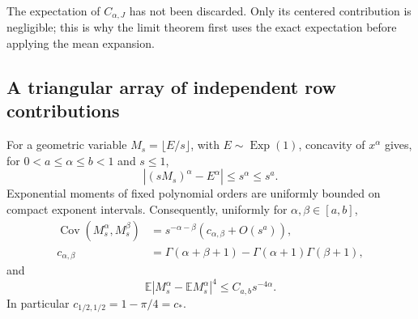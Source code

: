 \documentclass[11pt,letterpaper]{article}
\numberwithin{equation}{section}
\theoremstyle{definition}\newtheorem{definition}[theorem]{Definition}
\theoremstyle{remark}\newtheorem{remark}[theorem]{Remark}
\newcommand{\E}{\mathbb E}
\DeclareMathOperator{\Cov}{Cov}
\begin{document}
The expectation of $C_{\alpha,J}$ has not been discarded. Only its
centered contribution is negligible; this is why the limit theorem
first uses the exact expectation before applying the mean expansion.

\subsection{A triangular array of independent row contributions}
For a geometric variable $M_s=\lfloor E/s\rfloor$, with
$E\sim\operatorname{Exp}(1)$, concavity of $x^\alpha$ gives, for
$0<a\le\alpha\le b<1$ and $s\le1$,
\begin{equation}\label{dmv:fl:eq:floorwindow}
 \left|(sM_s)^\alpha-E^\alpha\right|\le s^\alpha\le s^a.
\end{equation}
Exponential moments of fixed polynomial orders are uniformly bounded
on compact exponent intervals. Consequently, uniformly for
$\alpha,\beta\in[a,b]$,
\begin{align}\label{dmv:fl:eq:covwindowrow}
 \Cov(M_s^\alpha,M_s^\beta)
 &=s^{-\alpha-\beta}
       \left(c_{\alpha,\beta}+O(s^a)\right),\\
 c_{\alpha,\beta}
 &=\Gamma(\alpha+\beta+1)-\Gamma(\alpha+1)\Gamma(\beta+1),
 \nonumber
\end{align}
and
\begin{equation}\label{dmv:fl:eq:fourthrowwindow}
 \E|M_s^\alpha-\E M_s^\alpha|^4\le C_{a,b}s^{-4\alpha}.
\end{equation}
In particular $c_{1/2,1/2}=1-\pi/4=c_*$.
\end{document}
